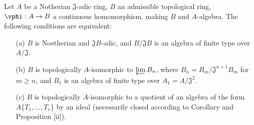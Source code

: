 \begin{proposition}[7.5.5]
\label{0.7.5.5}
Let $A$ be a Notherian $\mathfrak{J}$-adic ring, $B$ an admissible topological ring,
$\vphi:A\to B$ a continuous homomorphism, making $B$ and $A$-algebra. The following
conditions are equivalent:
\begin{enumerate}
  \item[{\rm(a)}] $B$ is Noetherian and $\mathfrak{J}B$-adic, and $B/\mathfrak{J}B$ is an
    algebra of finite type over $A/\mathfrak{J}$.
  \item[{\rm(b)}] $B$ is topologically $A$-isomorphic to $\varprojlim B_n$, where
    $B_n=B_m/\mathfrak{J}^{n+1}B_m$ for $m\geq n$, and $B_1$ is an algebra of finite
    type over $A_1=A/\mathfrak{J}^2$.
  \item[{\rm(c)}] $B$ is topologically $A$-isomorphic to a quotient of an algebra of the form
    $A\{T_1,\dots,T_r\}$ by an ideal (necessarily closed according to
    Corollary  and Proposition [ii]).
\end{enumerate}
\end{proposition}

